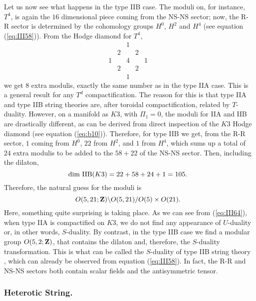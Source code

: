 Let us now see what happens in the type IIB case. The moduli on,
for instance, $T^4$, is again the $16$ dimensional piece coming
from the NS-NS sector; now, the R-R sector is determined by the
cohomology groups $H^0$, $H^2$ and $H^4$ (see equation
(\ref{eq:III58})). From the Hodge diamond for $T^4$,
\begin{equation}
\begin{array}{ccccc}  &   & 1  &   &    \\
					      & 2  &   & 2  &    \\
					    1  &   & 4 &   & 1  \\
					      & 2  &   & 2  &    \\
					      &   & 1 &     & 
	\end{array}
\label{eq:hodge}
\end{equation}
we get $8$ extra modulis, exactly the same number as in the type
IIA case. This is a general result for any $T^d$
compactification. The reason for this is that type IIA and type
IIB string theories are, after toroidal compactification, related
by $T$-duality. However, on a manifold as $K3$, with $\Pi_1=0$,
the moduli for IIA and IIB are drastically different, as can be
derived from direct inspection of the $K3$ Hodge diamond (see
equation (\ref{eq:b10})). Therefore, for type IIB we get, from
the R-R sector, $1$ coming from $H^0$, $22$ from $H^2$, and $1$
from $H^4$, which sums up a total of $24$ extra modulis to be
added to the $58+22$ of the NS-NS sector. Then, including the
dilaton,
\begin{equation}
\hbox {dim IIB}(K3) = 22+58+24+1=105.
\label{eq:III67}
\end{equation}
Therefore, the natural guess for the moduli is
\begin{equation}
O(5,21;{\bf Z}) \backslash O(5,21) / O(5) \times O(21).
\label{eq:III68}
\end{equation}
Here, something quite surprising is taking place. As we can see
from (\ref{eq:III64}), when type IIA is compactified on $K3$, we
do not find any appearance of $U$-duality or, in other words,
$S$-duality. By contrast, in the type IIB case we find a modular
group $O(5,2;{\bf Z})$, that contains the dilaton and, therefore,
the $S$-duality transformation. This is what can be called the
$S$-duality of type IIB string theory \cite{Schwarz}, which can already be
observed from equation (\ref{eq:III58}). In fact, the R-R and
NS-NS sectors both contain scalar fields and the antisymmetric
tensor. 


\subsubsection{Heterotic String.}

